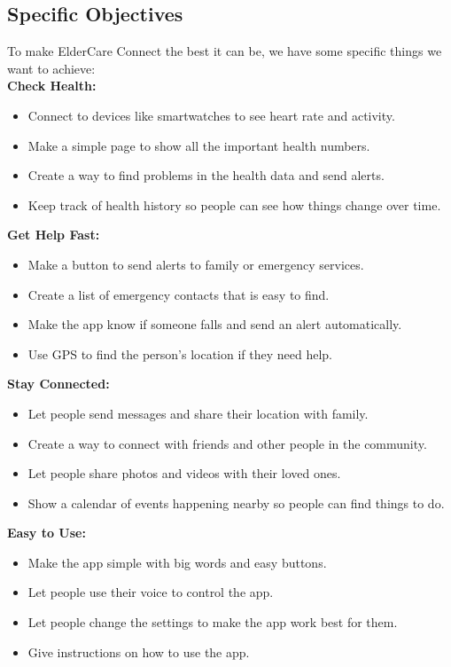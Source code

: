 \subsection{Specific Objectives}
To make ElderCare Connect the best it can be, we have some specific things we want to achieve:\\
\textbf{Check Health:}
\begin{itemize}
    \item Connect to devices like smartwatches to see heart rate and activity.
    \item Make a simple page to show all the important health numbers.
    \item Create a way to find problems in the health data and send alerts.
    \item Keep track of health history so people can see how things change over time.
\end{itemize}
\textbf{Get Help Fast:}
\begin{itemize}
    \item Make a button to send alerts to family or emergency services.
    \item Create a list of emergency contacts that is easy to find.
    \item Make the app know if someone falls and send an alert automatically.
    \item Use GPS to find the person's location if they need help.
\end{itemize}
\textbf{Stay Connected:}
\begin{itemize}
    \item Let people send messages and share their location with family.
    \item Create a way to connect with friends and other people in the community.
    \item Let people share photos and videos with their loved ones.
    \item Show a calendar of events happening nearby so people can find things to do.
\end{itemize}
\textbf{Easy to Use:}
\begin{itemize}
    \item Make the app simple with big words and easy buttons.
    \item Let people use their voice to control the app.
    \item Let people change the settings to make the app work best for them.
    \item Give instructions on how to use the app.
\end{itemize}
